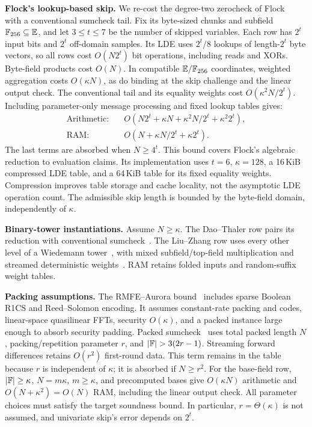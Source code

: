 \smallskip\noindent\textbf{Flock's lookup-based skip.}
We re-cost the degree-two zerocheck of
Flock~\cite[Sections~4.2--4.4]{iacr/BunzRW26} with a conventional
sumcheck tail. Fix its byte-sized chunks and subfield
\(\mathbb F_{256}\subseteq\mathbb{E}\), and let
\(3\leq t\leq7\) be the number of skipped variables.
Each row has \(2^t\) input bits and \(2^t\) off-domain samples.
Its LDE uses \(2^t/8\) lookups of length-\(2^t\) byte vectors,
so all rows cost \(O(N2^t)\) bit operations, including reads
and XORs. Byte-field products cost \(O(N)\).
In compatible \(\mathbb{E}/\mathbb F_{256}\) coordinates,
weighted aggregation costs \(O(\kappa N)\), as do binding at
the skip challenge and the linear output check.
The conventional tail and its equality weights cost
\(O(\kappa^2N/2^t)\). Including parameter-only message
processing and fixed lookup tables gives:
\begin{equation}
\begin{aligned}
\text{Arithmetic:}\quad&
O\!\left(N2^t+\kappa N+\kappa^2N/2^t+\kappa^2 2^t\right),\\
\text{RAM:}\quad&
O\!\left(N+\kappa N/2^t+\kappa 2^t\right).
\end{aligned}
\label{eq:hadamard-flock-full-cost}
\end{equation}
The last terms are absorbed when \(N\geq4^t\).
This bound covers Flock's algebraic reduction to evaluation claims.
Its implementation uses \(t=6\), \(\kappa=128\),
a 16\,KiB compressed LDE table, and a 64\,KiB table for its
fixed equality weights. Compression improves table storage and
cache locality, not the asymptotic LDE operation count.
The admissible skip length is bounded by the byte-field domain,
independently of \(\kappa\).

\smallskip\noindent\textbf{Binary-tower instantiations.}
Assume \(N\geq\kappa\). The Dao--Thaler row pairs its reduction
with conventional sumcheck~\cite{iacr/DaoT24}.
The Liu--Zhang row uses every other level of a Wiedemann
tower~\cite{iacr/LiuZ25}, with mixed subfield/top-field multiplication
and streamed deterministic weights~\cite{iacr/DaoT24}.
RAM retains folded inputs and random-suffix weight tables.

\smallskip\noindent\textbf{Packing assumptions.}
The RMFE--Aurora bound~\cite{iacr/CascudoG21} includes sparse Boolean
R1CS and Reed--Solomon encoding. It assumes constant-rate packing and
codes, linear-space quasilinear FFTs, security \(O(\kappa)\), and a
packed instance large enough to absorb security padding.
Packed sumcheck~\cite{iacr/WeiWXZDWZ25} uses total packed length \(N\),
packing/repetition parameter \(r\), and \(|\Field|>3(2r-1)\).
Streaming forward differences retains \(O(r^2)\) first-round data.
This term remains in the table because \(r\) is independent of
\(\kappa\); it is absorbed if \(N\geq r^2\).
For the base-field \methodname{} row, \(|{\mathbb{F}}|\geq\kappa\),
\(N=m\kappa\), \(m\geq\kappa\), and precomputed
bases give \(O(\kappa N)\) arithmetic and
\(O(N+\kappa^2)=O(N)\) RAM, including the linear output check.
All parameter choices must satisfy the target soundness bound.
In particular, \(r=\Theta(\kappa)\) is not assumed, and univariate
skip's error depends on \(2^t\).

